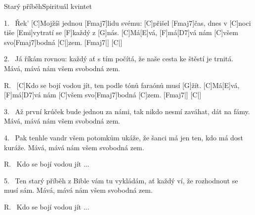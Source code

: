 \begin{song}{Starý příběh}{Spirituál kvintet}

\begin{xverse}{1.~}
Řek' [C]Mojžíš jednou [Fmaj7]lidu svému: [C]přišel [Fmaj7]{}čas,
dnes v [C]noci tiše [Emi]vytratí se [F]každý z [G]nás.
[C]Má[E]vá, [F]má[D7]vá nám [C]všem svo[Fmaj7]bodná [C|]{zem.} [Fmaj7|]{} [C|]{}
\end{xverse}


\begin{xverse}{2.~}
Já říkám rovnou: každý ať s tím počítá,
že naše cesta ke štěstí je trnitá.
Mává, mává nám všem svobodná zem.
\end{xverse}


\begin{xverse}{R.~}
[C]Kdo se bojí vodou jít,
ten podle tónů faraónů musí [G]{}žít.
[C]Má[E]vá, [F]má[D7]vá nám [C]všem svo[Fmaj7]bodná [C]{zem.} [Fmaj7|]{} [C|]{}
\end{xverse}


\begin{xverse}{3.~}
Až první krúček bude jednou za námi,
tak nikdo nesmí zaváhat, dát na fámy.
Mává, mává nám všem svobodná zem.
\end{xverse}


\begin{xverse}{4.~}
Pak tenhle vandr všem potomkům ukáže,
že šanci má jen ten, kdo má dost kuráže.
Mává, mává nám všem svobodná zem.
\end{xverse}


\begin{xverse}{R.~}
Kdo se bojí vodou jít ...
\end{xverse}


\begin{xverse}{5.~}
Ten starý příběh z Bible vám tu vykládám,
ať každý ví, že rozhodnout se musí sám.
Mává, mává nám všem svobodná zem.
\end{xverse}


\begin{xverse}{R.~}
Kdo se bojí vodou jít ...
\end{xverse}

\end{song}

